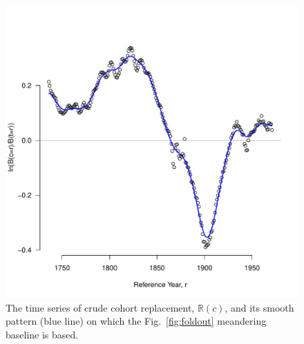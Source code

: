 \begin{figure}[ht!]
\centering
\includegraphics[scale=.6]{Figures/Meander.pdf}
\caption{The time series of crude cohort replacement, $\mathbb{R}(c)$, and its smooth pattern (blue line) on which the Fig.~\ref{fig:foldout} meandering baseline is based.}
\label{fig:meander}
\end{figure}




